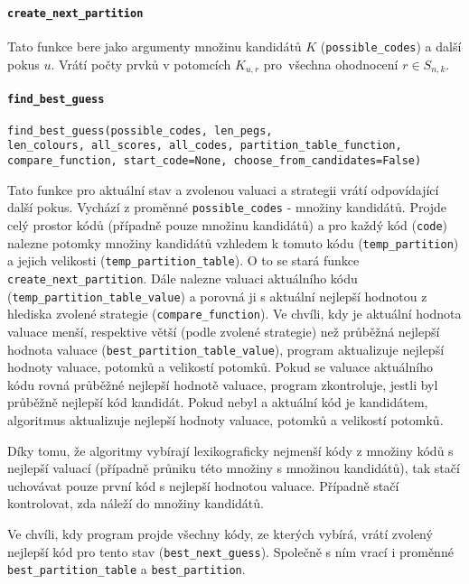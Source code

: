 \documentclass[12pt,a4paper]{article}
\begin{document}
\paragraph{\texttt{create\_next\_partition}}
Tato funkce bere jako argumenty množinu kandidátů $K$ (\texttt{possible\_codes}) a další pokus $u$. Vrátí počty prvků v potomcích $K_{u,r}$ pro~všechna ohodnocení $r \in S_{n,k}$.

\paragraph{\texttt{find\_best\_guess}}
\texttt{find\_best\_guess(possible\_codes, len\_pegs,}\\
\texttt{len\_colours, all\_scores, all\_codes, partition\_table\_function,}\\
\texttt{compare\_function, start\_code=None, choose\_from\_candidates=False)}

Tato funkce pro aktuální stav a zvolenou valuaci a strategii vrátí odpovídající další pokus. Vychází z proměnné \texttt{possible\_codes} - množiny kandidátů. Projde celý prostor kódů (případně pouze množinu kandidátů) a pro každý kód (\texttt{code}) nalezne potomky množiny kandidátů vzhledem k tomuto kódu (\texttt{temp\_partition}) a jejich velikosti (\texttt{temp\_partition\_table}). O to se stará funkce \texttt{create\_next\_partition}. Dále nalezne valuaci aktuálního kódu (\texttt{temp\_partition\_table\_value}) a porovná ji s aktuální nejlepší hodnotou z hlediska zvolené strategie (\texttt{compare\_function}). Ve chvíli, kdy je aktuální hodnota valuace menší, respektive větší (podle zvolené strategie) než průběžná nejlepší hodnota valuace (\texttt{best\_partition\_table\_value}), program aktualizuje nejlepší hodnoty valuace, potomků a velikostí potomků. Pokud se valuace aktuálního kódu rovná průběžné nejlepší hodnotě valuace, program zkontroluje, jestli byl průběžně nejlepší kód kandidát. Pokud nebyl a aktuální kód je kandidátem, algoritmus aktualizuje nejlepší hodnoty valuace, potomků a velikostí potomků. 

Díky tomu, že algoritmy vybírají lexikograficky nejmenší kódy z množiny kódů s nejlepší valuací (případně průniku této množiny s množinou kandidátů), tak stačí uchovávat pouze první kód s nejlepší hodnotou valuace. Případně stačí kontrolovat, zda náleží do množiny kandidátů.

Ve chvíli, kdy program projde všechny kódy, ze kterých vybírá, vrátí zvolený nejlepší kód pro tento stav (\texttt{best\_next\_guess}). Společně s ním vrací i proměnné \texttt{best\_partition\_table} a \texttt{best\_partition}. 
\end{document}
